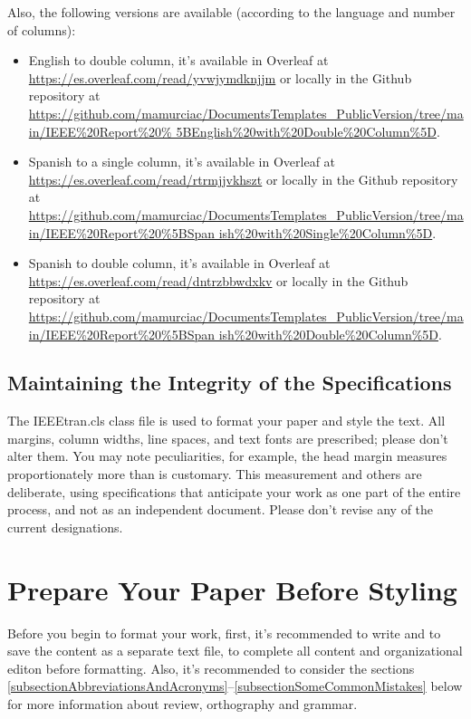 \documentclass[letterpaper, 10pt, conference]{IEEEtran} %
\begin{document}
	Also, the following versions are available (according to the language and number of columns):
	\begin{itemize}
		\item English to double column, it's available in Overleaf at \href{https://es.overleaf.com/read/yvwjymdknjjm}{https://es.overleaf.com/read/yvwjymdknjjm} or locally in the Github repository at \href{https://github.com/mamurciac/DocumentsTemplates_PublicVersion/tree/main/IEEE%20Report%20%5BEnglish%20with%20Double%20Column%5D}{https://github.com/mamurciac/DocumentsTemplates\_PublicVersion/tree/main/IEEE\%20Report\%20\% 5BEnglish\%20with\%20Double\%20Column\%5D}.
		\item Spanish to a single column, it's available in Overleaf at \href{https://es.overleaf.com/read/rtrmjjvkhszt}{https://es.overleaf.com/read/rtrmjjvkhszt} or locally in the Github repository at \href{https://github.com/mamurciac/DocumentsTemplates_PublicVersion/tree/main/IEEE%20Report%20%5BSpanish%20with%20Single%20Column%5D}{https://github.com/mamurciac/DocumentsTemplates\_PublicVersion/tree/main/IEEE\%20Report\%20\%5BSpan ish\%20with\%20Single\%20Column\%5D}.
		\item Spanish to double column, it's available in Overleaf at \href{https://es.overleaf.com/read/dntrzbbwdxkv}{https://es.overleaf.com/read/dntrzbbwdxkv} or locally in the Github repository at \href{https://github.com/mamurciac/DocumentsTemplates_PublicVersion/tree/main/IEEE%20Report%20%5BSpanish%20with%20Double%20Column%5D}{https://github.com/mamurciac/DocumentsTemplates\_PublicVersion/tree/main/IEEE\%20Report\%20\%5BSpan ish\%20with\%20Double\%20Column\%5D}.
	\end{itemize}
	
	\subsection{Maintaining the Integrity of the Specifications} \label{subsectionMaintainingTheIntegrityOfTheSpecifications}
	The IEEEtran.cls class file is used to format your paper and style the text. All margins, column widths, line spaces, and text fonts are prescribed; please don't alter them. You may note peculiarities, for example, the head margin measures proportionately more than is customary. This measurement and others are deliberate, using specifications that anticipate your work as one part of the entire process, and not as an independent document. Please don't revise any of the current designations.
	
	\section{Prepare Your Paper Before Styling} \label{sectionPrepareYourPaperBeforeStyling}
	Before you begin to format your work, first, it's recommended to write and to save the content as a separate text file, to complete all content and organizational editon before formatting. Also, it's recommended to consider the sections \ref{subsectionAbbreviationsAndAcronyms}--\ref{subsectionSomeCommonMistakes} below for more information about review, orthography and grammar.
	
\end{document}
